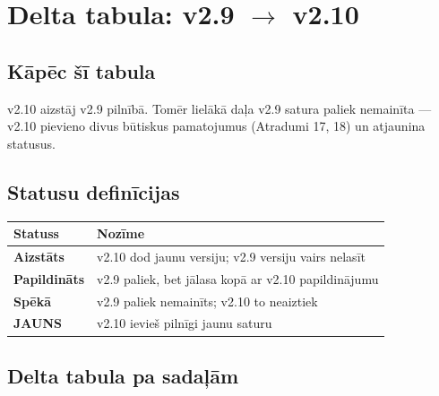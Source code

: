 \documentclass[12pt,a4paper]{article}
\begin{document}
\newpage

\section{Delta tabula: v2.9 $\to$ v2.10}
\label{sec:delta}

\subsection*{Kāpēc šī tabula}

v2.10 aizstāj v2.9 pilnībā. Tomēr lielākā daļa v2.9 satura paliek nemainīta — v2.10 pievieno divus būtiskus pamatojumus (Atradumi 17, 18) un atjaunina statusus.

\subsection*{Statusu definīcijas}

\begin{table}[h]
\centering
\begin{tabular}{|l|l|}
\hline
\textbf{Statuss} & \textbf{Nozīme} \\
\hline
\textbf{Aizstāts} & v2.10 dod jaunu versiju; v2.9 versiju vairs nelasīt \\
\textbf{Papildināts} & v2.9 paliek, bet jālasa kopā ar v2.10 papildinājumu \\
\textbf{Spēkā} & v2.9 paliek nemainīts; v2.10 to neaiztiek \\
\textbf{JAUNS} & v2.10 ievieš pilnīgi jaunu saturu \\
\hline
\end{tabular}
\end{table}

\subsection*{Delta tabula pa sadaļām}
\end{document}
